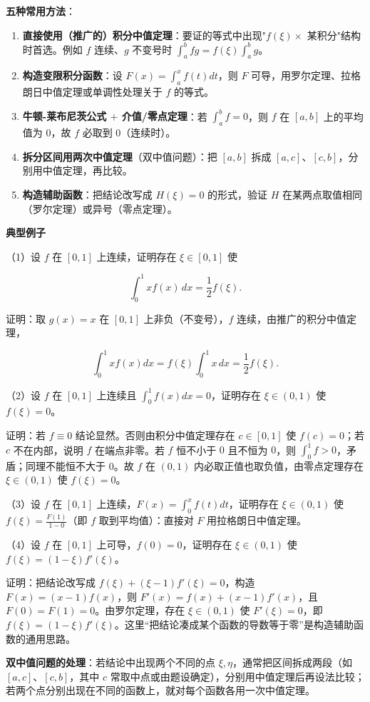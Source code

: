 \documentclass[11pt,openany,UTF8]{ctexbook}
\begin{document}
\textbf{五种常用方法}：

\begin{enumerate}
\item \textbf{直接使用（推广的）积分中值定理}：要证的等式中出现"$f(\xi)\times$ 某积分"结构时首选。例如 $f$ 连续、$g$ 不变号时 $\int_a^bfg=f(\xi)\int_a^bg$。
\item \textbf{构造变限积分函数}：设 $F(x)=\int_a^xf(t)dt$，则 $F$ 可导，用罗尔定理、拉格朗日中值定理或单调性处理关于 $f$ 的等式。
\item \textbf{牛顿-莱布尼茨公式 $+$ 介值/零点定理}：若 $\int_a^bf=0$，则 $f$ 在 $[a,b]$ 上的平均值为 $0$，故 $f$ 必取到 $0$（连续时）。
\item \textbf{拆分区间用两次中值定理}（双中值问题）：把 $[a,b]$ 拆成 $[a,c]$、$[c,b]$，分别用中值定理，再比较。
\item \textbf{构造辅助函数}：把结论改写成 $H(\xi)=0$ 的形式，验证 $H$ 在某两点取值相同（罗尔定理）或异号（零点定理）。
\end{enumerate}
\textbf{典型例子}

（1）设 $f$ 在 $[0,1]$ 上连续，证明存在 $\xi\in[0,1]$ 使

\[\int_0^1xf(x)\,dx=\frac{1}{2}f(\xi).\]

证明：取 $g(x)=x$ 在 $[0,1]$ 上非负（不变号），$f$ 连续，由推广的积分中值定理，

\[\int_0^1xf(x)dx=f(\xi)\int_0^1x\,dx=\frac{1}{2}f(\xi).\]

（2）设 $f$ 在 $[0,1]$ 上连续且 $\int_0^1f(x)dx=0$，证明存在 $\xi\in(0,1)$ 使 $f(\xi)=0$。

证明：若 $f\equiv0$ 结论显然。否则由积分中值定理存在 $c\in[0,1]$ 使 $f(c)=0$；若 $c$ 不在内部，说明 $f$ 在端点非零。若 $f$ 恒不小于 $0$ 且不恒为 $0$，则 $\int_0^1f>0$，矛盾；同理不能恒不大于 $0$。故 $f$ 在 $(0,1)$ 内必取正值也取负值，由零点定理存在 $\xi\in(0,1)$ 使 $f(\xi)=0$。

（3）设 $f$ 在 $[0,1]$ 上连续，$F(x)=\int_0^xf(t)dt$，证明存在 $\xi\in(0,1)$ 使 $f(\xi)=\frac{F(1)}{1-0}$（即 $f$ 取到平均值）：直接对 $F$ 用拉格朗日中值定理。

（4）设 $f$ 在 $[0,1]$ 上可导，$f(0)=0$，证明存在 $\xi\in(0,1)$ 使 $f(\xi)=(1-\xi)f'(\xi)$。

证明：把结论改写成 $f(\xi)+(\xi-1)f'(\xi)=0$，构造 $F(x)=(x-1)f(x)$，则 $F'(x)=f(x)+(x-1)f'(x)$，且 $F(0)=F(1)=0$。由罗尔定理，存在 $\xi\in(0,1)$ 使 $F'(\xi)=0$，即 $f(\xi)=(1-\xi)f'(\xi)$。这里“把结论凑成某个函数的导数等于零”是构造辅助函数的通用思路。

\textbf{双中值问题的处理}：若结论中出现两个不同的点 $\xi,\eta$，通常把区间拆成两段（如 $[a,c]$、$[c,b]$，其中 $c$ 常取中点或由题设确定），分别用中值定理后再设法比较；若两个点分别出现在不同的函数上，就对每个函数各用一次中值定理。
\end{document}
